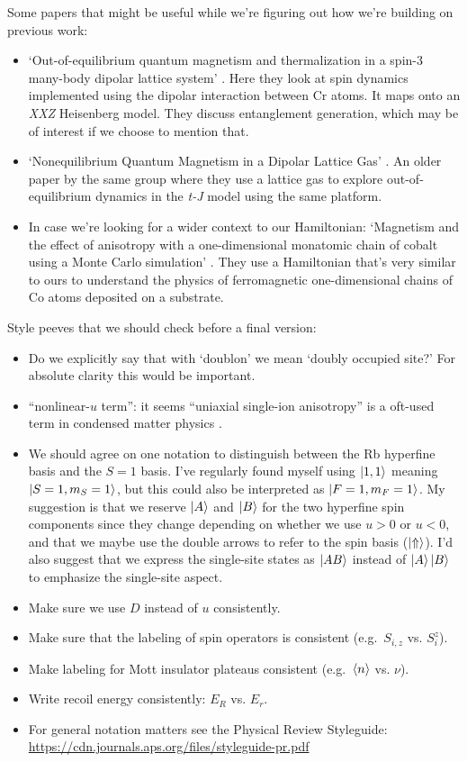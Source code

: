 \documentclass[aps,prl,twocolumn,superscriptaddress]{revtex4-1}
\begin{document}
Some papers that might be useful while we're figuring out how we're building on previous work:
\begin{itemize}
    \item `Out-of-equilibrium quantum magnetism and thermalization in a spin-3 many-body dipolar lattice system' \cite{Lepoutre2019}. Here they look at spin dynamics implemented using the dipolar interaction between Cr atoms. It maps onto an \emph{XXZ} Heisenberg model. They discuss entanglement generation, which may be of interest if we choose to mention that.
    
    \item `Nonequilibrium Quantum Magnetism in a Dipolar Lattice Gas' \cite{dePaz2013}. An older paper by the same group where they use a lattice gas to explore out-of-equilibrium dynamics in the \emph{t-J} model using the same platform.
    
    \item In case we're looking for a wider context to our Hamiltonian: `Magnetism and the effect of anisotropy with a one-dimensional monatomic chain of cobalt using a Monte Carlo simulation' \cite{He2007}. They use a Hamiltonian that's very similar to ours to understand the physics of ferromagnetic one-dimensional chains of Co atoms deposited on a substrate.
\end{itemize}

Style peeves that we should check before a final version:
\begin{itemize}
    \item Do we explicitly say that with `doublon' we mean `doubly occupied site?' For absolute clarity this would be important.
    \item ``nonlinear-$u$ term'': it seems ``uniaxial single-ion anisotropy'' is a oft-used term in condensed matter physics \cite{WANG20091904, He2007}.
    \item We should agree on one notation to distinguish between the Rb hyperfine basis and the $S = 1$ basis. I've regularly found myself using $\ket{1, 1}$ meaning $\ket{S = 1, m_S = 1}$, but this could also be interpreted as $\ket{F = 1, m_F = 1}$. My suggestion is that we reserve $\ket{A}$ and $\ket{B}$ for the two hyperfine spin components since they change depending on whether we use $u > 0$ or $u < 0$, and that we maybe use the double arrows to refer to the spin basis ($\ket{\Uparrow}$). I'd also suggest that we express the single-site states as $\ket{AB}$ instead of $\ket{A}\ket{B}$ to emphasize the single-site aspect.
    \item Make sure we use $D$ instead of $u$ consistently.
    \item Make sure that the labeling of spin operators is consistent (e.g.\ $S_{i,z}$ vs. $S_i^z$).
    \item Make labeling for Mott insulator plateaus consistent (e.g.\ $\braket{n}$ vs. $\nu$).
    \item Write recoil energy consistently: $E_R$ vs. $E_r$.
    \item For general notation matters see the Physical Review Styleguide: \url{https://cdn.journals.aps.org/files/styleguide-pr.pdf}
\end{itemize}
\end{document}
